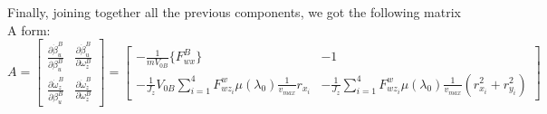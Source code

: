 \documentclass[a4paper,12pt,titlepage]{report}
\begin{document}
	Finally, joining together all the previous components, we got the following matrix A form:
		\begin{equation}
			A=
			\begin{bmatrix}
				\frac{\partial\dot{\beta}_{u}^{B}}{\partial\beta_{u}^{B}} & \frac{\partial\dot{\beta}_{u}^{B}}{\partial\omega_{z}^{B}} \\
				\frac{\partial\dot{\omega}_{z}^{B}}{\partial\beta_{u}^{B}} & \frac{\partial\dot{\omega}_{z}^{B}}{\partial\omega_{z}^{B}}
			\end{bmatrix} = 
			\begin{bmatrix}
				 -\frac{1}{mV_{0B}}\{F_{wx}^{B}\}  & -1  \\
				  -\frac{1}{J_{z}} V_{0B} \sum\limits_{i=1}^4 F_{wz_{i}}^{w} \mu(\lambda_{0}) \frac{1}{v_{max}}r_{x_{i}} &  -\frac{1}{J_{z}}\sum\limits_{i=1}^4 F_{wz_{i}}^{w} \mu(\lambda_{0}) \frac{1}{v_{max}} (r_{x_{i}}^{2} + r_{y_{i}}^{2}) 
			\end{bmatrix}
		\end{equation}
\end{document}
